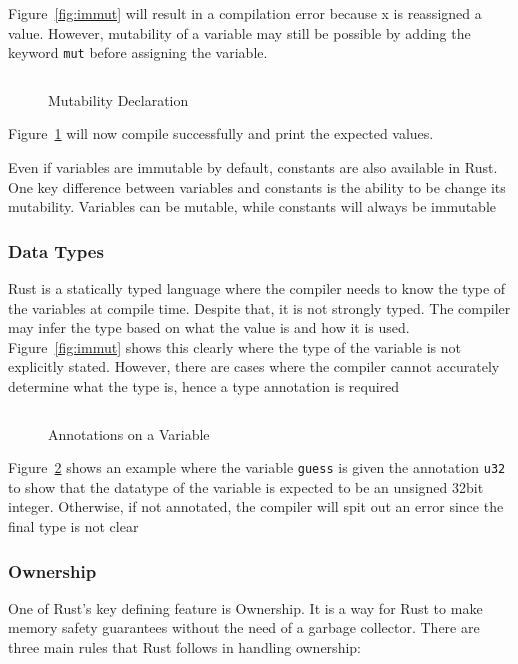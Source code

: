 \documentclass{article}
\newcommand{\rust}[1]{\inputminted{rust}{samples/rust/#1.rs}}
\newcommand{\rustin}[1]{\texttt{#1}}
\begin{document}
  Figure~\ref{fig:immut} will result in a compilation error because x is
  reassigned a value. However, mutability of a variable may still be possible by
  adding the keyword \rustin{mut} before assigning the variable.

  \begin{figure}[ht]
    \rust{mutability}
    \caption{Mutability Declaration}
    \label{fig:mut}
  \end{figure}

  Figure~\ref{fig:mut} will now compile successfully and print the expected
  values.

  Even if variables are immutable by default, constants are also available in
  Rust. One key difference between variables and constants is the ability to be
  change its mutability. Variables can be mutable, while constants will always
  be immutable

  \subsubsection{Data Types}
  Rust is a statically typed language where the compiler needs to know the type
  of the variables at compile time. Despite that, it is not strongly typed. The
  compiler may infer the type based on what the value is and how it is used.
  Figure~\ref{fig:immut} shows this clearly where the type of the variable is
  not explicitly stated. However, there are cases where the compiler cannot
  accurately determine what the type is, hence a type annotation is required

  \begin{figure}[ht]
    \rust{annotations}
    \caption{Annotations on a Variable}
    \label{fig:annot}
  \end{figure}

  Figure~\ref{fig:annot} shows an example where the variable \rustin{guess} is
  given the annotation \rustin{u32} to show that the datatype of the variable is
  expected to be an unsigned 32bit integer. Otherwise, if not annotated, the
  compiler will spit out an error since the final type is not clear

  \subsubsection{Ownership}
  One of Rust's key defining feature is Ownership. It is a way for Rust to make
  memory safety guarantees without the need of a garbage collector. There are
  three main rules that Rust follows in handling ownership:
\end{document}
